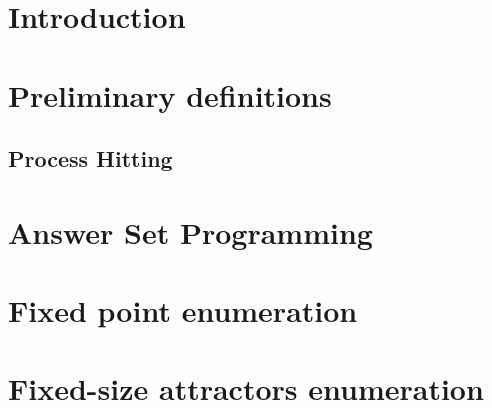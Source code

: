 \documentclass{bmcart}
\begin{document}
\begin{frontmatter}
\begin{fmbox}
\begin{abstractbox}
\begin{keyword}
\end{keyword}


\end{abstractbox}
%
\end{fmbox}%

\end{frontmatter}



\newcommand{\benchmarksfootnote}{\footnote{All programs and benchmarks are available at \url{http://www.irccyn.ec-nantes.fr/~benabdal/automata-networks-analysis.zip}}}

\section{Introduction}


\section{Preliminary definitions}
\label{sec:defs}
\subsection{Process Hitting}


\section{Answer Set Programming}
\label{sec:asp}


\section{Fixed point enumeration}
\label{sec:fixpoint}


\section{Fixed-size attractors enumeration}
\label{sec:attractors}


%
\end{document}
